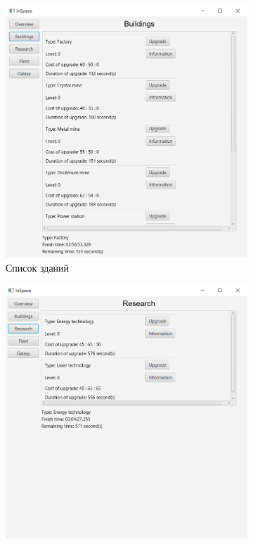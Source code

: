 \begin{figure}[H]
\begin{subfigure}[b]{0.4\textwidth}
\includegraphics[width=1\textwidth]{../screenshots/2.png}
\caption{Список зданий}
\end{subfigure}
\begin{subfigure}[b]{0.4\textwidth} 
\includegraphics[width=1\textwidth]{../screenshots/3.png}

\end{subfigure}
\end{figure}
